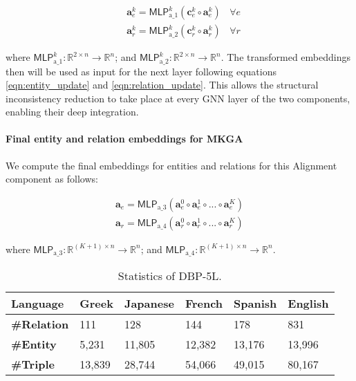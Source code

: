 \documentclass[11pt]{article}
\begin{document}
\begin{align}
    & {{{{\mathbf{a}^k_e}}}} = {{\mathsf{MLP}}}^k_{\text{a\_1}}\left({\mathbf{c}^k_e} \circ {\mathbf{a}^k_e} \right)\ \ \ \ \forall e \label{eqn:aesir}\\
    & {{{\mathbf{a}}}^k_r} = {{\mathsf{MLP}}}^k_{\text{a\_2}} \left( {\mathbf{c}^k_r}  \circ {\mathbf{a}^k_r} \right)\ \ \ \ \forall r \label{eqn:arsir}
\end{align}

\noindent where $\mathsf{MLP}_{\text{a\_1}}^k: \mathbb{R}^{2\times n} \rightarrow \mathbb{R}^n$; and $\mathsf{MLP}_{\text{a\_2}}^k: \mathbb{R}^{2\times n} \rightarrow \mathbb{R}^n$. The transformed embeddings then will be used as input for the next layer following equations \ref{eqn:entity_update} and \ref{eqn:relation_update}. 
This allows the structural inconsistency reduction to take place at every GNN layer of the two components, enabling their deep integration. 

\paragraph{Final  entity and relation embeddings for MKGA} We compute the final embeddings for entities and relations for this Alignment component as follows:


\begin{align}
    \mathbf{a}_e = \mathsf{MLP}_{\text{a\_3}} \left( \mathbf{a}_e^0 \circ \mathbf{a}_e^1 \circ ... \circ \mathbf{a}_e^K \right) \\
    \mathbf{a}_r = \mathsf{MLP}_{\text{a\_4}} \left(  \mathbf{a}_r^0 \circ \mathbf{a}_r^1 \circ ... \circ \mathbf{a}_r^K \right)
    \label{eqn:all_rel}
\end{align}

\noindent where $\mathsf{MLP}_{\text{a\_3}}: \mathbb{R}^{(K+1)\times n} \rightarrow \mathbb{R}^n$; and $\mathsf{MLP}_{\text{a\_4}}: \mathbb{R}^{(K+1)\times n} \rightarrow \mathbb{R}^n$.


\begin{table*}[!t]
\centering
\def\arraystretch{1.1}
    \begin{tabular}{l|l|l|l|l|l}
    \hline
         \bf Language & \bf Greek & \bf Japanese & \bf French & \bf Spanish & \bf English \\
         \hline
         \bf \#Relation & 111 & 128 & 144 & 178 & 831 \\
         \hline
         \bf \#Entity & 5,231 & 11,805 & 12,382 & 13,176 & 13,996 \\
         \hline
         \bf \#Triple & 13,839 & 28,744 & 54,066 & 49,015 & 80,167 \\
         \hline 
\end{tabular}
\caption{Statistics of DBP-5L.}
    \label{tab:datasetstats}
\end{table*}
\end{document}
